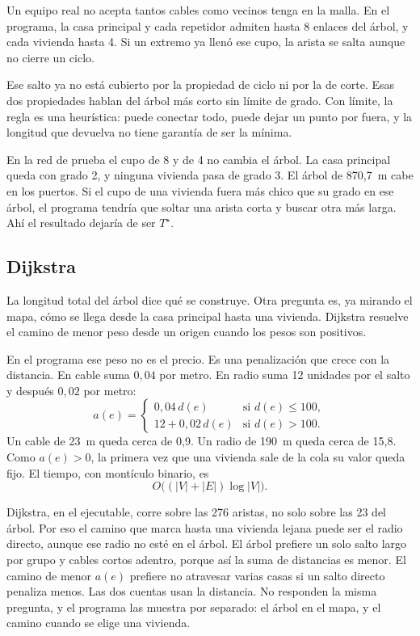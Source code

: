 \documentclass[12pt,a4paper]{article}
\begin{document}
Un equipo real no acepta tantos cables como vecinos tenga en la malla. En el programa, la casa principal y cada repetidor admiten hasta 8 enlaces del árbol, y cada vivienda hasta 4. Si un extremo ya llenó ese cupo, la arista se salta aunque no cierre un ciclo.

Ese salto ya no está cubierto por la propiedad de ciclo ni por la de corte. Esas dos propiedades hablan del árbol más corto sin límite de grado. Con límite, la regla es una heurística: puede conectar todo, puede dejar un punto por fuera, y la longitud que devuelva no tiene garantía de ser la mínima.

En la red de prueba el cupo de 8 y de 4 no cambia el árbol. La casa principal queda con grado 2, y ninguna vivienda pasa de grado 3. El árbol de 870,7~m cabe en los puertos. Si el cupo de una vivienda fuera más chico que su grado en ese árbol, el programa tendría que soltar una arista corta y buscar otra más larga. Ahí el resultado dejaría de ser \(T^{\star}\).

\subsection{Dijkstra}

La longitud total del árbol dice qué se construye. Otra pregunta es, ya mirando el mapa, cómo se llega desde la casa principal hasta una vivienda. Dijkstra resuelve el camino de menor peso desde un origen cuando los pesos son positivos.

En el programa ese peso no es el precio. Es una penalización que crece con la distancia. En cable suma \(0{,}04\) por metro. En radio suma 12 unidades por el salto y después \(0{,}02\) por metro:
\begin{equation}
  a(e) =
  \begin{cases}
    0{,}04\, d(e) & \text{si } d(e) \le 100,\\
    12 + 0{,}02\, d(e) & \text{si } d(e) > 100.
  \end{cases}
  \label{eq:aten}
\end{equation}
Un cable de 23~m queda cerca de 0,9. Un radio de 190~m queda cerca de 15,8. Como \(a(e) > 0\), la primera vez que una vivienda sale de la cola su valor queda fijo. El tiempo, con montículo binario, es
\begin{equation}
  O\bigl((|V| + |E|)\log |V|\bigr).
  \label{eq:tdijkstra}
\end{equation}

Dijkstra, en el ejecutable, corre sobre las 276 aristas, no solo sobre las 23 del árbol. Por eso el camino que marca hasta una vivienda lejana puede ser el radio directo, aunque ese radio no esté en el árbol. El árbol prefiere un solo salto largo por grupo y cables cortos adentro, porque así la suma de distancias es menor. El camino de menor \(a(e)\) prefiere no atravesar varias casas si un salto directo penaliza menos. Las dos cuentas usan la distancia. No responden la misma pregunta, y el programa las muestra por separado: el árbol en el mapa, y el camino cuando se elige una vivienda.
\end{document}

